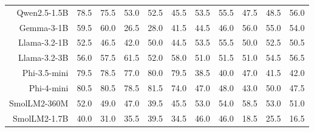 \documentclass[letterpaper]{article}
\begin{document}
\begin{table}[t]
{\begin{tabular}{rccccc|ccccc}
Qwen2.5-1.5B & \cellcolor[HTML]{DDEBD2}78.5 & \cellcolor[HTML]{E0ECD2}75.5 & \cellcolor[HTML]{FCF1CD}53.0 & \cellcolor[HTML]{FDF1CC}52.5 & \cellcolor[HTML]{FDECCC}45.5 & \cellcolor[HTML]{E2ECD1}53.5 & \cellcolor[HTML]{DEEBD2}55.5 & \cellcolor[HTML]{EDEECF}47.5 & \cellcolor[HTML]{EBEED0}48.5 & \cellcolor[HTML]{DEEBD2}56.0 \\
Gemma-3-1B & \cellcolor[HTML]{F4F0CE}59.5 & \cellcolor[HTML]{F3F0CE}60.0 & \cellcolor[HTML]{F6D5CC}26.5 & \cellcolor[HTML]{F7D6CC}28.0 & \cellcolor[HTML]{FCE7CC}41.5 & \cellcolor[HTML]{F2EFCE}44.5 & \cellcolor[HTML]{F0EFCF}46.0 & \cellcolor[HTML]{DEEBD2}56.0 & \cellcolor[HTML]{DFEBD2}55.0 & \cellcolor[HTML]{E1ECD2}54.0 \\
Llama-3.2-1B & \cellcolor[HTML]{FDF1CC}52.5 & \cellcolor[HTML]{FEEDCC}46.5 & \cellcolor[HTML]{FCE8CC}42.0 & \cellcolor[HTML]{FFF1CC}50.0 & \cellcolor[HTML]{FDEBCC}44.5 & \cellcolor[HTML]{E2ECD1}53.5 & \cellcolor[HTML]{DEEBD2}55.5 & \cellcolor[HTML]{E8EDD0}50.0 & \cellcolor[HTML]{E4ECD1}52.5 & \cellcolor[HTML]{E7EDD0}50.5 \\
Llama-3.2-3B & \cellcolor[HTML]{F8F1CD}56.0 & \cellcolor[HTML]{F6F0CE}57.5 & \cellcolor[HTML]{F2EFCE}61.5 & \cellcolor[HTML]{FDF2CC}52.0 & \cellcolor[HTML]{F6F0CE}58.0 & \cellcolor[HTML]{E7EDD0}51.0 & \cellcolor[HTML]{E6EDD1}51.5 & \cellcolor[HTML]{E7EDD0}51.0 & \cellcolor[HTML]{E0ECD2}54.5 & \cellcolor[HTML]{DDEBD2}56.5 \\
Phi-3.5-mini & \cellcolor[HTML]{DBEBD3}79.5 & \cellcolor[HTML]{DDEBD2}78.5 & \cellcolor[HTML]{DFEBD2}77.0 & \cellcolor[HTML]{DBEAD3}80.0 & \cellcolor[HTML]{DBEBD3}79.5 & \cellcolor[HTML]{FDF2CC}38.5 & \cellcolor[HTML]{FAF1CD}40.0 & \cellcolor[HTML]{EEEECF}47.0 & \cellcolor[HTML]{F8F0CD}41.5 & \cellcolor[HTML]{F7F0CE}42.0 \\
Phi-4-mini & \cellcolor[HTML]{DAEAD3}80.5 & \cellcolor[HTML]{DAEAD3}80.5 & \cellcolor[HTML]{DDEBD2}78.5 & \cellcolor[HTML]{D9EAD3}81.5 & \cellcolor[HTML]{E2ECD1}74.0 & \cellcolor[HTML]{EEEECF}47.0 & \cellcolor[HTML]{ECEED0}48.0 & \cellcolor[HTML]{F5F0CE}43.0 & \cellcolor[HTML]{E8EDD0}50.0 & \cellcolor[HTML]{EDEECF}47.5 \\
SmolLM2-360M & \cellcolor[HTML]{FDF2CC}52.0 & \cellcolor[HTML]{FEF0CC}49.0 & \cellcolor[HTML]{FEEECC}47.0 & \cellcolor[HTML]{FBE5CC}39.5 & \cellcolor[HTML]{FDECCC}45.5 & \cellcolor[HTML]{E3ECD1}53.0 & \cellcolor[HTML]{E1ECD2}54.0 & \cellcolor[HTML]{D9EAD3}58.5 & \cellcolor[HTML]{E3ECD1}53.0 & \cellcolor[HTML]{E7EDD0}51.0 \\
SmolLM2-1.7B & \cellcolor[HTML]{FBE5CC}40.0 & \cellcolor[HTML]{F8DACC}31.0 & \cellcolor[HTML]{FAE0CC}35.5 & \cellcolor[HTML]{FBE5CC}39.5 & \cellcolor[HTML]{F9DECC}34.5 & \cellcolor[HTML]{F0EFCF}46.0 & \cellcolor[HTML]{F0EFCF}46.0 & \cellcolor[HTML]{F5D0CC}18.5 & \cellcolor[HTML]{F9DCCC}25.5 & \cellcolor[HTML]{F4CCCC}16.5 \\

\end{tabular}}
\end{table}
\end{document}
